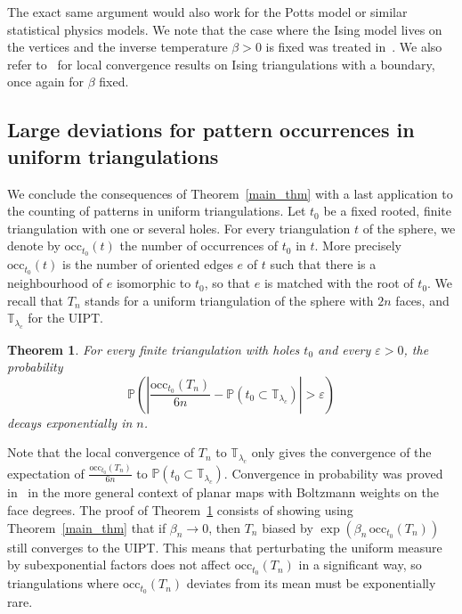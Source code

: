 \documentclass[10pt]{amsart}
\newtheorem{theo}{Theorem}[section]
\theoremstyle{definition}\newtheorem{defi}[theo]{Definition}\newtheorem{rema}[theo]{Remark}\newtheorem{exam}[theo]{Example}\newtheorem{exem}[theo]{Example}\newtheorem{nota}[theo]{Notation}
\newcommand{\eps}{\varepsilon}
\newcommand{\TT}{\mathbb{T}}
\renewcommand{\P}{\mathbb{P}}
\newcommand{\occ}{\mathrm{occ}}
\begin{document}
The exact same argument would also work for the Potts model or similar statistical physics models. We note that the case where the Ising model lives on the vertices and the inverse temperature $\beta>0$ is fixed was treated in~\cite{AMS20}. We also refer to~\cite{CT20, CT20b, CT20c} for local convergence results on Ising triangulations with a boundary, once again for $\beta$ fixed.

\subsection*{Large deviations for pattern occurrences in uniform triangulations}
We conclude the consequences of Theorem~\ref{main_thm} with a last application to the counting of patterns in uniform triangulations. Let $t_0$ be a fixed rooted, finite triangulation with one or several holes. For every triangulation $t$ of the sphere, we denote by $\occ_{t_0}(t)$ the number of occurrences of $t_0$ in $t$. More precisely $\occ_{t_0}(t)$ is the number of oriented edges $e$ of $t$ such that there is a neighbourhood of $e$ isomorphic to $t_0$, so that $e$ is matched with the root of $t_0$. We recall that $T_n$ stands for a uniform triangulation of the sphere with $2n$ faces, and $\TT_{\lambda_c}$ for the UIPT.


\begin{theo}\label{thm_large_deviations}
For every finite triangulation with holes $t_0$ and every $\eps>0$, the probability
\[
\P \left(\left| \frac{\occ_{t_0}(T_n)}{6n} - \P \left(t_0 \subset \TT_{\lambda_c} \right) \right|> \eps \right)
\]
decays exponentially in $n$.
\end{theo}


Note that the local convergence of $T_n$ to $\TT_{\lambda_c}$ only gives the convergence of the expectation of $\frac{\occ_{t_0}(T_n)}{6n}$ to $\P (t_0 \subset \TT_{\lambda_c})$. Convergence in probability was proved in~\cite{BD18} in the more general context of planar maps with Boltzmann weights on the face degrees. The proof of Theorem~\ref{thm_large_deviations} consists of showing using Theorem~\ref{main_thm} that if $\beta_n \to 0$, then $T_n$ biased by $\exp (\beta_n \, \occ_{t_0}(T_n))$ still converges to the UIPT. This means that perturbating the uniform measure by subexponential factors does not affect $\occ_{t_0}(T_n)$ in a significant way, so triangulations where $\occ_{t_0}(T_n)$ deviates from its mean must be exponentially rare.
\end{document}
